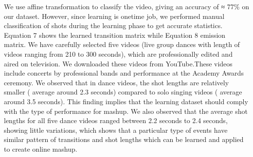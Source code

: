 \documentclass{IEEEtran}
\begin{document}
We use affine transformation to classify the video, giving an accuracy of ≈ 77\% on our dataset. However, since learning is onetime job, we performed manual classification of shots during the learning phase to get accurate statistics. Equation 7 shows the learned transition matrix while Equation 8 emission matrix. We have carefully selected five videos (live group dances with length of videos ranging from 210 to 300 seconds), which are professionally edited and aired on television. We downloaded these videos from YouTube.These videos include concerts by professional bands and performance at the Academy Awards ceremony. We observed that in dance videos, the shot lengths are relatively smaller ( average around 2.3 seconds) compared to solo singing videos ( average around 3.5 seconds). This finding implies that the learning dataset should comply with the type of performance for mashup. We also observed that the average shot lengths for all five dance videos ranged between 2.2 seconds to 2.4 seconds, showing little variations, which shows that a particular type of events have similar pattern of transitions and shot lengths which can be learned and applied to create online mashup.
\end{document}
